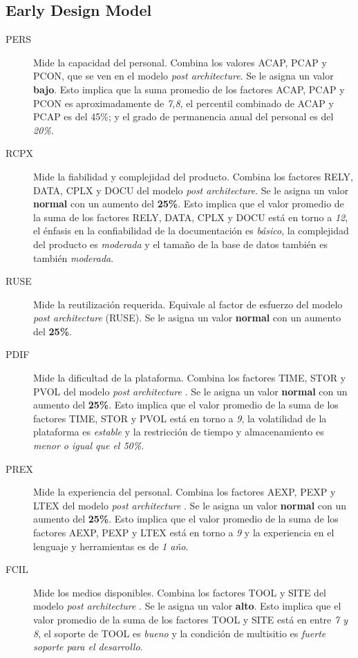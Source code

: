 \documentclass[11pt,a4paper,spanish,twoside]{report}
\begin{document}
\subsection{Early Design Model}
\begin{description}
\item[PERS] Mide la capacidad del personal. Combina los valores ACAP, PCAP y
PCON, que se ven en el modelo \emph{post architecture}. Se le asigna un
valor \textbf{bajo}. Esto implica que la suma promedio de los factores
ACAP, PCAP y PCON es aproximadamente de \emph{7,8}, el percentil combinado
de ACAP y PCAP es del 45\%; y el grado de permanencia anual del personal es
del \emph{20\%}.

\item[RCPX] Mide la fiabilidad y complejidad del producto. Combina los
factores RELY, DATA, CPLX y DOCU del modelo \emph{post architecture}. Se le
asigna un valor \textbf{normal} con un aumento del \textbf{25\%}. Esto
implica que el valor promedio de la suma de los factores RELY, DATA, CPLX y
DOCU está en torno a \emph{12}, el énfasis en la confiabilidad de la
documentación es \emph{básico}, la complejidad del producto es
\emph{moderada} y el tamaño de la base de datos también es también
\emph{moderada}.

\item[RUSE] Mide la reutilización requerida. Equivale al factor de esfuerzo
del modelo \emph{post architecture} (RUSE). Se le asigna un valor
\textbf{normal} con un aumento del \textbf{25\%}.

\item[PDIF] Mide la dificultad de la plataforma. Combina los factores TIME, 
STOR y PVOL del modelo \emph{post architecture} . Se le asigna un valor
\textbf{normal} con un aumento del \textbf{25\%}. Esto implica que el valor 
promedio de la suma de los factores TIME, STOR y PVOL está en torno a \emph{9},
la volatilidad de la plataforma es \emph{estable} y la restricción de tiempo y
almacenamiento es \emph{menor o igual que el 50\%}.

\item[PREX] Mide la experiencia del personal. Combina los factores AEXP, PEXP y
LTEX del modelo \emph{post architecture} . Se le asigna un valor 
\textbf{normal} con un aumento del \textbf{25\%}. Esto implica que el valor 
promedio de la suma de los factores AEXP, PEXP y LTEX está en torno a \emph{9}
y la experiencia en el lenguaje y herramientas es de \emph{1 año}.

\item[FCIL] Mide los medios disponibles. Combina los factores TOOL y SITE del 
modelo \emph{post architecture} . Se le asigna un valor \textbf{alto}. Esto 
implica que el valor promedio de la suma de los factores TOOL y SITE está en 
entre \emph{7 y 8}, el soporte de TOOL es \emph{bueno} y la condición de 
multisitio es \emph{fuerte soporte para el desarrollo}.

\end{description}
\end{document}
